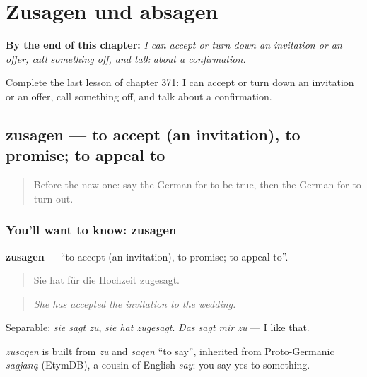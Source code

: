 
\chapter{Zusagen und absagen}
\label{ch:ge-zusagen-und-absagen}

\begin{chapteropening}
\textbf{By the end of this chapter:} \emph{I can accept or turn down an invitation or an offer, call something off, and talk about a confirmation.}

Complete the last lesson of chapter 371: I can accept or turn down an invitation or an offer, call something off, and talk about a confirmation.
\end{chapteropening}

\section[zusagen]{zusagen — to accept (an invitation), to promise; to appeal to}

\label{lesson:GE-C371-zusagen}



\begin{quote}
Before the new one: say the German for to be true, then the German for to turn out.
\end{quote}

\subsection*{You'll want to know: zusagen}
\textbf{zusagen} — \textquotedblleft{}to accept (an invitation), to promise; to appeal to\textquotedblright{}.

\begin{quote}
Sie hat für die Hochzeit zugesagt.
\end{quote}

\begin{quote}
\emph{She has accepted the invitation to the wedding.}
\end{quote}

Separable: \emph{sie sagt zu}, \emph{sie hat zugesagt}. \emph{Das sagt mir zu} — I like that.

\begin{cousinweb}
\emph{zusagen} is built from \emph{zu} and \emph{sagen} \textquotedblleft{}to say\textquotedblright{}, inherited from Proto-Germanic \emph{sagjaną} (EtymDB), a cousin of English \emph{say}: you say yes to something.
\end{cousinweb}

